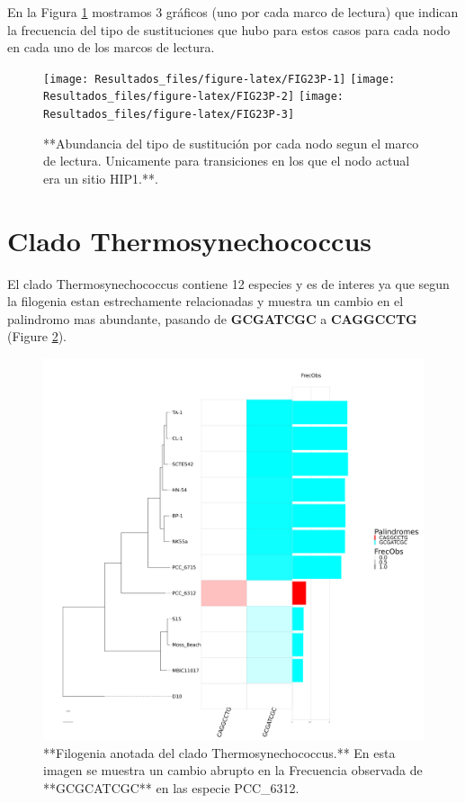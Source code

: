 \documentclass[
]{book}
\begin{document}
En la Figura \ref{fig:FIG23P} mostramos 3 gráficos (uno por cada marco de lectura) que indican la frecuencia del tipo de sustituciones que hubo para estos casos para cada nodo en cada uno de los marcos de lectura.

\begin{figure}

{\centering \texttt{[image: Resultados\_files/figure-latex/FIG23P-1]} \texttt{[image: Resultados\_files/figure-latex/FIG23P-2]} \texttt{[image: Resultados\_files/figure-latex/FIG23P-3]} 

}

\caption{**Abundancia del tipo de sustitución por cada nodo segun el marco de lectura. Unicamente para transiciones en los que el nodo actual era un sitio HIP1.**.}\label{fig:FIG23P}
\end{figure}

\hypertarget{clado-thermosynechococcus}{%
\section{Clado Thermosynechococcus}\label{clado-thermosynechococcus}}

El clado Thermosynechococcus contiene 12 especies y es de interes ya que segun la filogenia estan estrechamente relacionadas y muestra un cambio en el palindromo mas abundante, pasando de \textbf{GCGATCGC} a \textbf{CAGGCCTG} (Figure \ref{fig:FIG12T}).

\begin{figure}

{\centering \includegraphics[width=1\linewidth]{Clados/Thermosynechococcus_clade/figures/thermosynechococcus_Octanuc_FrecObs_sel32_filogenia_HIG} 

}

\caption{**Filogenia anotada del clado Thermosynechococcus.** En esta imagen se muestra un cambio abrupto en la Frecuencia observada de **GCGCATCGC** en las especie PCC\_6312.}\label{fig:FIG12T}
\end{figure}
\end{document}
